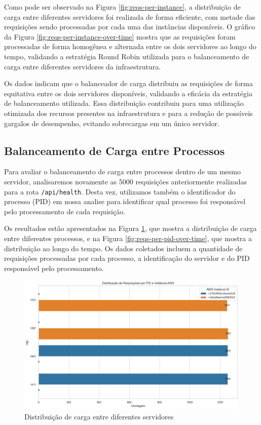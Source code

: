 Como pode ser observado na Figura \ref{fig:reqs-per-instance}, a distribuição de carga entre diferentes servidores foi realizada de forma eficiente, com metade das requisições sendo processadas por cada uma das instâncias disponíveis. O gráfico da Figura \ref{fig:reqs-per-instance-over-time} mostra que as requisições foram processadas de forma homogênea e alternada entre os dois servidores ao longo do tempo, validando a estratégia Round Robin utilizada para o balanceamento de carga entre diferentes servidores da infraestrutura.

Os dados indicam que o balanceador de carga distribuiu as requisições de forma equitativa entre os dois servidores disponíveis, validando a eficácia da estratégia de balanceamento utilizada. Essa distribuição contribuiu para uma utilização otimizada dos recursos presentes na infraestrutura e para a redução de possíveis gargalos de desempenho, evitando sobrecargas em um único servidor.

\subsection{Balanceamento de Carga entre Processos}

Para avaliar o balanceamento de carga entre processos dentro de um mesmo servidor, analisaremos novamente as 5000 requisições anteriormente realizadas para a rota \texttt{/api/health}. Desta vez, utilizamos também o identificador do processo (PID) em nossa analise para identificar qual processo foi responsável pelo processamento de cada requisição.

Os resultados estão apresentados na Figura \ref{fig:reqs-per-pid}, que mostra a distribuição de carga entre diferentes processos, e na Figura \ref{fig:reqs-per-pid-over-time}, que mostra a distribuição ao longo do tempo. Os dados coletados incluem a quantidade de requisições processadas por cada processo, a identificação do servidor e do PID responsável pelo processamento.


\begin{figure}[H]
    \centering
    \includegraphics[width=1\textwidth]{assets/balance-test/reqs-per-pid.png}
    \caption{Distribuição de carga entre diferentes servidores}
    \label{fig:reqs-per-pid}
\end{figure}

